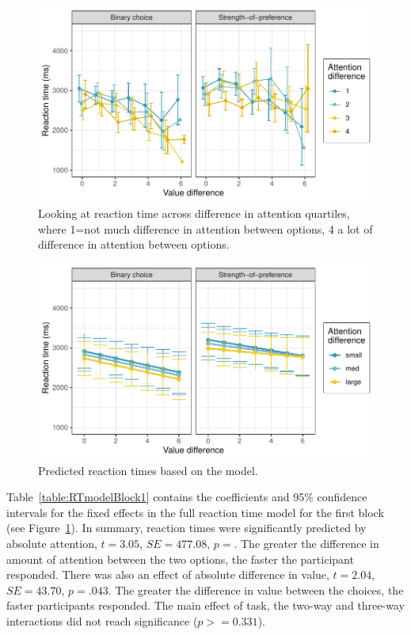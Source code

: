\documentclass[12pt]{article}
\begin{document}
\begin{figure}[b!]
	\centering
	\includegraphics{images/RTattentionValueGraph}
	\caption{Looking at reaction time across difference in attention quartiles, where 1=not much difference in attention between options, 4 a lot of difference in attention between options.}
	\label{figure:RTattentionValueGraph}
\end{figure}

\begin{figure}[b!]
	\centering
	\includegraphics{images/predictedRTattentionValueGraph.pdf}
	\caption{Predicted reaction times based on the model.}
	\label{figure:predictedRTattentionValueGraph}
\end{figure}

Table~\ref{table:RTmodelBlock1} contains the coefficients and 95\% confidence intervals for the fixed effects in the full reaction time model for the first block (see Figure~\ref{figure:RTattentionValueGraph}). In summary, reaction times were significantly predicted by absolute attention, $t=3.05$, $SE=477.08$, $p=$. The greater the difference in amount of attention between the two options, the faster the participant responded. There was also an effect of absolute difference in value, $t=2.04$, $SE=43.70$, $p=.043$. The greater the difference in value between the choices, the faster participants responded. The main effect of task, the two-way and three-way interactions did not reach significance ($p>=0.331$). 
\end{document}
